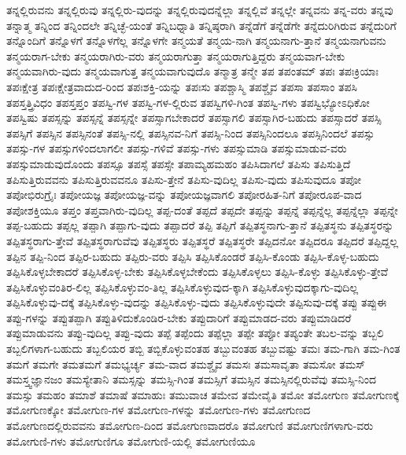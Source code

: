{ತನ್ನಲ್ಲಿರುವನು
ತನ್ನಲ್ಲಿರುವು
ತನ್ನಲ್ಲಿರು-ವುದನ್ನು
ತನ್ನಲ್ಲಿರುವುದನ್ನೆಲ್ಲಾ
ತನ್ನಲ್ಲಿವೆ
ತನ್ನಲ್ಲೇ
ತನ್ನವನು
ತನ್ನ-ವರು
ತನ್ನವು
ತನ್ನಾತ್ಮ
ತನ್ನಿಂದ
ತನ್ನಿಂದಲೇ
ತನ್ನಿಚ್ಛೆ-ಯಂತೆ
ತನ್ನಿಬಧ್ನಾತಿ
ತನ್ನಿಷ್ಠರಾಗಿ
ತನ್ನೆಡೆಗೆ
ತನ್ನೆಡೆಗೇ
ತನ್ನೆದುರಿಗಿರುವ
ತನ್ನೆದುರಿಗೆ
ತನ್ನೊಂದಿಗೆ
ತನ್ನೊಳಗೆ
ತನ್ನೊಳಗೆಲ್ಲ
ತನ್ನೊಳಗೇ
ತನ್ಮಯತೆ
ತನ್ಮಯ-ನಾಗಿ
ತನ್ಮಯನಾಗು-ತ್ತಾನೆ
ತನ್ಮಯನಾಗುವನು
ತನ್ಮಯರಾಗ-ಬೇಕು
ತನ್ಮಯರಾಗಿರು-ವರು
ತನ್ಮಯರಾಗುತ್ತಾ
ತನ್ಮಯರಾಗುತ್ತಿದ್ದರು
ತನ್ಮಯವಾಗ-ಬೇಕು
ತನ್ಮಯವಾಗಿರು-ವುದು
ತನ್ಮಯವಾಗುತ್ತ
ತನ್ಮಯವಾಗುವುದೊ
ತನ್ಮಾತ್ರ
ತನ್ಮೇ
ತಪ
ತಪಂತಮ್
ತಪಃ
ತಪಃಕ್ರಿಯಾಃ
ತಪಃಕ್ಷೇತ್ರ
ತಪಃಕ್ಷೇತ್ರವಾದುದ-ರಿಂದ
ತಪಃಶಕ್ತಿ-ಯನ್ನು
ತಪಃಸು
ತಪಶ್ಚಾಸ್ಮಿ
ತಪಶ್ಚೈವ
ತಪಸಾ
ತಪಸಾಂ
ತಪಸಿ
ತಪಸ್ತತ್ತ್ರಿವಿಧಂ
ತಪಸ್ತಪ್ತಂ
ತಪಸ್ವಿ-ಗಳ
ತಪಸ್ವಿ-ಗಳ-ಲ್ಲಿರುವ
ತಪಸ್ವಿಗಳಿ-ಗಿಂತ
ತಪಸ್ವಿ-ಗಳು
ತಪಸ್ವಿಭ್ಯೋಽಧಿಕೋ
ತಪಸ್ವಿಷು
ತಪಸ್ಸನ್ನು
ತಪಸ್ಸನ್ನೆ
ತಪಸ್ಸನ್ನೇ
ತಪಸ್ಸಾಗಬೇಕಾದರೆ
ತಪಸ್ಸಾಗಲಿ
ತಪಸ್ಸಾಗಿರ-ಬಹುದು
ತಪಸ್ಸಾದರೆ
ತಪಸ್ಸಿ
ತಪಸ್ಸಿಗೆ
ತಪಸ್ಸಿನ
ತಪಸ್ಸಿನಂತೆ
ತಪಸ್ಸಿ-ನಲ್ಲಿ
ತಪಸ್ಸಿನವ-ನಿಗೆ
ತಪಸ್ಸಿ-ನಿಂದ
ತಪಸ್ಸಿನಿಂದಲೂ
ತಪಸ್ಸಿನಿಂದಲೆ
ತಪಸ್ಸು
ತಪಸ್ಸು-ಗಳ
ತಪಸ್ಸುಗಳಿಂದಲಾಗಲೀ
ತಪಸ್ಸು-ಗಳಿವೆ
ತಪಸ್ಸು-ಗಳು
ತಪಸ್ಸುಮಾಡಿ
ತಪಸ್ಸುಮಾಡುವ-ವರು
ತಪಸ್ಸುಮಾಡುವುದೊಂದು
ತಪಸ್ಸೂ
ತಪಸ್ಸೆ
ತಪಸ್ಸೇ
ತಪಾಮ್ಯಹಮಹಂ
ತಪಿಸಿದಾಗಲೆ
ತಪಿಸು
ತಪಿಸುತ್ತಿದೆ
ತಪಿಸುತ್ತಿರುವವನು
ತಪಿಸುತ್ತಿರುವವನೂ
ತಪಿಸು-ತ್ತೇನೆ
ತಪಿಸು-ವುದಿಲ್ಲ
ತಪಿಸು-ವುದು
ತಪಿಸುವುದೂ
ತಪೋ
ತಪೋಭಿರುಗ್ರೈಃ
ತಪೋಯಜ್ಞ
ತಪೋಯಜ್ಞ-ವನ್ನು
ತಪೋಯಜ್ಞವಾಗಲಿ
ತಪೋರಹಿತ-ನಿಗೆ
ತಪೋರೂಪ-ವಾದ
ತಪೋಶಕ್ತಿಯೂ
ತಪ್ತಂ
ತಪ್ತವಾಗಿರು-ವುದಿಲ್ಲ
ತಪ್ಪ-ದಂತೆ
ತಪ್ಪದೆ
ತಪ್ಪದೇ
ತಪ್ಪನ್ನು
ತಪ್ಪನ್ನೆ
ತಪ್ಪನ್ನೆಲ್ಲ
ತಪ್ಪನ್ನೆಲ್ಲಾ
ತಪ್ಪನ್ನೇ
ತಪ್ಪ-ಬಹುದು
ತಪ್ಪಲ್ಲ
ತಪ್ಪಾಗಿ
ತಪ್ಪಾಗು-ವುದು
ತಪ್ಪಾದರೆ
ತಪ್ಪಿ
ತಪ್ಪಿಗೆ
ತಪ್ಪಿತಸ್ಥನಾಗು-ತ್ತಾನೆ
ತಪ್ಪಿತಸ್ಥನು
ತಪ್ಪಿತಸ್ಥರನ್ನು
ತಪ್ಪಿತಸ್ಥರಾಗು-ತ್ತೇವೆ
ತಪ್ಪಿತಸ್ಥರಾಗುವೆವು
ತಪ್ಪಿತಸ್ಥರು
ತಪ್ಪಿತಸ್ಥರೆ
ತಪ್ಪಿತಸ್ಥರೇ
ತಪ್ಪಿದನೋ
ತಪ್ಪಿದರೂ
ತಪ್ಪಿದರೆ
ತಪ್ಪಿದ್ದಲ್ಲ
ತಪ್ಪಿನ
ತಪ್ಪಿ-ನಿಂದ
ತಪ್ಪಿರ-ಬಹುದು
ತಪ್ಪಿರು-ವರು
ತಪ್ಪಿಸಿ
ತಪ್ಪಿಸಿಕೊಂಡರೆ
ತಪ್ಪಿಸಿ-ಕೊಂಡು
ತಪ್ಪಿಸಿ-ಕೊಳ್ಳ-ಬಹುದು
ತಪ್ಪಿಸಿಕೊಳ್ಳಬೇಕಾದರೆ
ತಪ್ಪಿಸಿಕೊಳ್ಳ-ಬೇಕು
ತಪ್ಪಿಸಿಕೊಳ್ಳಬೇಕೆಂದು
ತಪ್ಪಿಸಿಕೊಳ್ಳಲು
ತಪ್ಪಿಸಿ-ಕೊಳ್ಳು
ತಪ್ಪಿಸಿಕೊಳ್ಳು-ತ್ತೇವೆ
ತಪ್ಪಿಸಿಕೊಳ್ಳುವಂತಿರ-ಲಿಲ್ಲ
ತಪ್ಪಿಸಿಕೊಳ್ಳುವಂ-ತಿಲ್ಲ
ತಪ್ಪಿಸಿಕೊಳ್ಳುವುದ-ಕ್ಕಾಗಿ
ತಪ್ಪಿಸಿಕೊಳ್ಳುವುದಕ್ಕಾಗು-ವುದಿಲ್ಲ
ತಪ್ಪಿಸಿಕೊಳ್ಳುವು-ದಕ್ಕೆ
ತಪ್ಪಿಸಿಕೊಳ್ಳು-ವುದನ್ನು
ತಪ್ಪಿಸಿಕೊಳ್ಳು-ವುದು
ತಪ್ಪಿಸಿಕೊಳ್ಳುವುದೇ
ತಪ್ಪಿಸುವು-ದಕ್ಕೆ
ತಪ್ಪು
ತಪ್ಪುಈ
ತಪ್ಪು-ಗಳನ್ನು
ತಪ್ಪುತಪ್ಪಾಗಿ
ತಪ್ಪುತಿಳಿದುಕೊಂಡಿರ-ಬೇಕು
ತಪ್ಪುದಾರಿಗೆ
ತಪ್ಪುಮಾಡದ-ವರು
ತಪ್ಪುಮಾಡಿದರೆ
ತಪ್ಪುಮಾಡುವನು
ತಪ್ಪು-ವುದಿಲ್ಲ
ತಪ್ಪು-ವುದು
ತಪ್ಪೆ
ತಪ್ಪೆಂದು
ತಪ್ಪೆಲ್ಲಾ
ತಪ್ಪೇ
ತಪ್ಪೋ
ತಪ್ಯಂತೇ
ತಬಲ-ವನ್ನು
ತಬ್ಬಲಿ
ತಬ್ಬಲಿಗಳಾಗ-ಬಹುದು
ತಬ್ಬಲಿಯರ
ತಬ್ಬಿ
ತಬ್ಬಿಕೊಳ್ಳುವಂತಹ
ತಬ್ಬುವಂತಹ
ತಬ್ಬುವಷ್ಟು
ತಮಃ
ತಮ-ಗಾಗಿ
ತಮ-ಗಿಂತ
ತಮಗೆ
ತಮಗೇ
ತಮತಮಗೆ
ತಮಭ್ಯರ್ಚ್ಯ
ತಮ-ವಾದ
ತಮಶ್ಚೈವ
ತಮಸಃ
ತಮಸಾವೃತಾ
ತಮಸೋ
ತಮಸ್
ತಮಸ್ತ್ವಜ್ಞಾನಜಂ
ತಮಸ್ಯೇತಾನಿ
ತಮಸ್ಸನ್ನು
ತಮಸ್ಸಿ-ಗಿಂತ
ತಮಸ್ಸಿಗೆ
ತಮಸ್ಸಿನ
ತಮಸ್ಸಿನಲ್ಲಿರುವೆವು
ತಮಸ್ಸಿ-ನಿಂದ
ತಮಸ್ಸು
ತಮಹಂ
ತಮಾಶೆ
ತಮಾಷೆ
ತಮಾಹುಃ
ತಮುವಾಚ
ತಮೇವ
ತಮೇವೈತಿ
ತಮೋ
ತಮೋಗುಣ
ತಮೋಗುಣಕ್ಕೆ
ತಮೋಗುಣಕ್ಕೋ
ತಮೋಗುಣ-ಗಳ
ತಮೋಗುಣ-ಗಳನ್ನು
ತಮೋಗುಣ-ಗಳು
ತಮೋಗುಣದ
ತಮೋಗುಣದಲ್ಲಿರುವವನು
ತಮೋಗುಣ-ದಿಂದ
ತಮೋಗುಣವಾದರೊ
ತಮೋಗುಣಿ
ತಮೋಗುಣಿಗಳಾಗು-ವರು
ತಮೋಗುಣಿ-ಗಳು
ತಮೋಗುಣಿಗೂ
ತಮೋಗುಣಿ-ಯಲ್ಲಿ
ತಮೋಗುಣಿಯೂ
}
